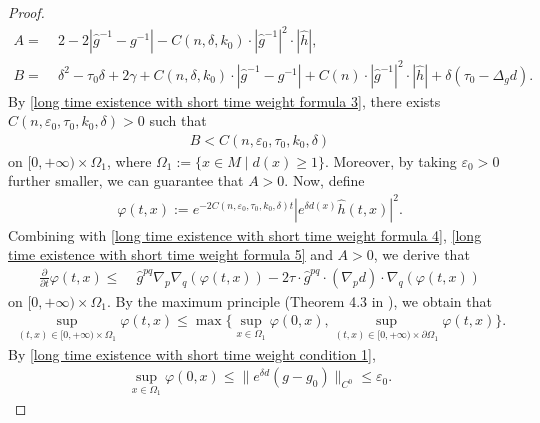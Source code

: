 \documentclass[12pt]{amsart}
\begin{document}
\begin{proof}
    \begin{align*}
        A =&\; 2 -2|\hat{g}^{-1} - g^{-1}| - C(n, \delta, k_0)\cdot|\hat{g}^{-1}|^2\cdot |\hat{h}|,\\ 
        B =&\; \delta^2 - \tau_0 \delta + 2\gamma + C(n, \delta, k_0)\cdot |\hat{g}^{-1} - g^{-1}| + C(n)\cdot |\hat{g}^{-1}|^2 \cdot |\hat{h}| + \delta (\tau_0 - \Delta_g d).
    \end{align*}
    By \eqref{long time existence with short time weight formula 3}, there exists $C(n, \varepsilon_0, \tau_0, k_0, \delta) > 0$ such that
    \begin{align}\label{long time existence with short time weight formula 5}
        B < C(n,\varepsilon_0,\tau_0, k_0, \delta)
    \end{align}
    on $[0, +\infty) \times \Omega_1$, where $\Omega_1 := \{x\in M \;|\; d(x) \geq 1\}$. Moreover, by taking $\varepsilon_0 > 0$ further smaller, we can guarantee that $A > 0$. Now, define
    \begin{align*}
        \varphi(t, x) := e^{-2C(n,\varepsilon_0,\tau_0, k_0, \delta)t}|e^{\delta d(x)}\hat{h}(t, x)|^2. 
    \end{align*}
    Combining with \eqref{long time existence with short time weight formula 4}, \eqref{long time existence with short time weight formula 5} and $A > 0$, we derive that 
    \begin{align}
        \frac{\partial}{\partial t} \varphi(t, x)
        \leq&\; \hat{g}^{pq} \nabla_p \nabla_q \left(\varphi(t, x) \right) - 2 \tau \cdot \hat{g}^{pq} \cdot (\nabla_p d) \cdot \nabla_q  \left(\varphi(t, x) \right) 
    \end{align}
    on $[0, +\infty) \times \Omega_1$. By the maximum principle (Theorem 4.3 in \cite{QSW2013}), we obtain that 
    \begin{equation}\label{long time existence with short time weight formula 6}
        \begin{split}
            \sup_{(t, x)\in [0, +\infty)\times\Omega_1}\varphi(t, x) \leq \max\Big\{\sup_{x\in \Omega_1}\varphi(0, x), \sup_{(t, x)\in [0, +\infty)\times\partial \Omega_1} \varphi(t, x) \Big\}. 
        \end{split}
    \end{equation}
    By \eqref{long time existence with short time weight condition 1}, 
    \begin{align}\label{long time existence with short time weight formula 7}
        \sup_{x\in \Omega_1} \varphi(0, x) \leq \|e^{\delta d}(g - g_0)\|_{C^0} \leq \varepsilon_0. 

\end{align}
\end{proof}
\end{document}

